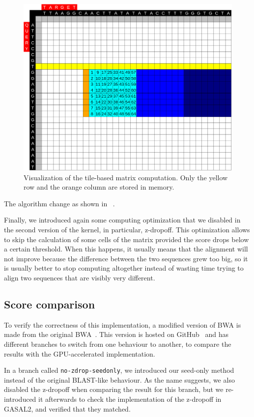\begin{figure}[h!]
	\centering
	\includegraphics[width=0.9\linewidth]{visualization-aid-tile}
	\caption{Visualization of the tile-based matrix computation. Only the yellow row and the orange column are stored in memory.}
	\label{fig:visualization-aid-tile}
\end{figure}

The algorithm change as shown in ~\cite{Ahmed:gasal}.

Finally, we introduced again some computing optimization that we disabled in the second version of the kernel, in particular, z-dropoff. This optimization allows to skip the calculation of some cells of the matrix provided the score drops below a certain threshold. When this happens, it usually means that the alignment will not improve because the difference between the two sequences grew too big, so it is usually better to stop computing altogether instead of wasting time trying to align two sequences that are visibly very different.

\subsection{Score comparison}

To verify the correctness of this implementation, a modified version of BWA is made from the original BWA~\cite{lh3:bwa}. This version is hosted on GitHub~\cite{j-levy:bwa} and has different branches to switch from one behaviour to another, to compare the results with the GPU-accelerated implementation.

In a branch called \verb|no-zdrop-seedonly|, we introduced our seed-only method instead of the original BLAST-like behaviour. As the name suggests, we also disabled the z-dropoff when comparing the result for this branch, but we re-introduced it afterwards to check the implementation of the z-dropoff in GASAL2, and verified that they matched.

